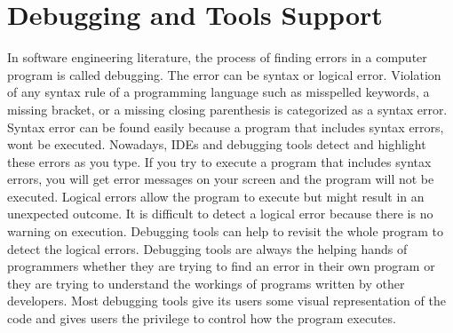 \section{Debugging and Tools Support}
In software engineering literature, the process of finding errors in a computer program is called debugging. The error can be syntax or logical error. Violation of any syntax rule of a programming language such as misspelled keywords, a missing bracket, or a missing closing parenthesis is categorized as a syntax error. Syntax error can be found easily because a program that includes syntax errors, won\textquotesingle t be executed. Nowadays, IDEs and debugging tools detect and highlight these errors as you type. If you try to execute a program that includes syntax errors, you will get error messages on your screen and the program will not be executed. Logical errors allow the program to execute but might result in an unexpected outcome.  It is difficult to detect a logical error because there is no warning on execution. Debugging tools can help to revisit the whole program to detect the logical errors.
Debugging tools are always the helping hands of programmers whether they are trying to find an error in their own program or they are trying to understand the workings of programs written by other developers. Most debugging tools give its users some visual representation of the code and gives users the privilege to control how the program executes.

